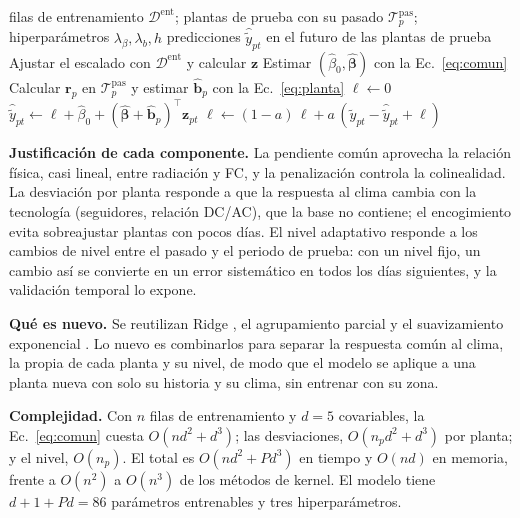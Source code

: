 \documentclass[pdflatex,sn-mathphys-num]{sn-jnl}
\begin{document}
\begin{algorithm}[t]
\caption{Ridge jerárquico con nivel adaptativo para un pliegue externo}\label{alg:propuesto}
\begin{algorithmic}[1]
\Require filas de entrenamiento $\mathcal{D}^{\text{ent}}$; plantas de prueba con su pasado $\mathcal{T}^{\text{pas}}_p$; hiperparámetros $\lambda_\beta,\lambda_b,h$
\Ensure predicciones $\hat{\tilde{y}}_{pt}$ en el futuro de las plantas de prueba
\State Ajustar el escalado con $\mathcal{D}^{\text{ent}}$ y calcular $\mathbf{z}$
\State Estimar $(\hat\beta_0,\hat{\boldsymbol{\beta}})$ con la Ec.~\eqref{eq:comun}
  \State Calcular $\mathbf{r}_p$ en $\mathcal{T}^{\text{pas}}_p$ y estimar $\hat{\mathbf{b}}_p$ con la Ec.~\eqref{eq:planta}
  \State $\ell \gets 0$
    \State $\hat{\tilde{y}}_{pt} \gets \ell + \hat\beta_0 + (\hat{\boldsymbol{\beta}}+\hat{\mathbf{b}}_p)^\top\mathbf{z}_{pt}$ 
    \State $\ell \gets (1-a)\,\ell + a\,(\tilde{y}_{pt} - \hat{\tilde{y}}_{pt} + \ell)$ 
  \EndFor
\EndFor
\end{algorithmic}
\end{algorithm}

\textbf{Justificación de cada componente.} La pendiente común aprovecha la relación física, casi lineal, entre radiación y FC, y la penalización controla la colinealidad. La desviación por planta responde a que la respuesta al clima cambia con la tecnología (seguidores, relación DC/AC), que la base no contiene; el encogimiento evita sobreajustar plantas con pocos días. El nivel adaptativo responde a los cambios de nivel entre el pasado y el periodo de prueba: con un nivel fijo, un cambio así se convierte en un error sistemático en todos los días siguientes, y la validación temporal lo expone.

\textbf{Qué es nuevo.} Se reutilizan Ridge \cite{hoerl1970ridge}, el agrupamiento parcial \cite{gelman2007multilevel} y el suavizamiento exponencial \cite{gardner1985exponential}. Lo nuevo es combinarlos para separar la respuesta común al clima, la propia de cada planta y su nivel, de modo que el modelo se aplique a una planta nueva con solo su historia y su clima, sin entrenar con su zona.

\textbf{Complejidad.} Con $n$ filas de entrenamiento y $d=5$ covariables, la Ec.~\eqref{eq:comun} cuesta $O(n d^2 + d^3)$; las desviaciones, $O(n_p d^2 + d^3)$ por planta; y el nivel, $O(n_p)$. El total es $O(n d^2 + P d^3)$ en tiempo y $O(n d)$ en memoria, frente a $O(n^2)$ a $O(n^3)$ de los métodos de kernel. El modelo tiene $d+1+Pd = 86$ parámetros entrenables y tres hiperparámetros.
\end{document}
